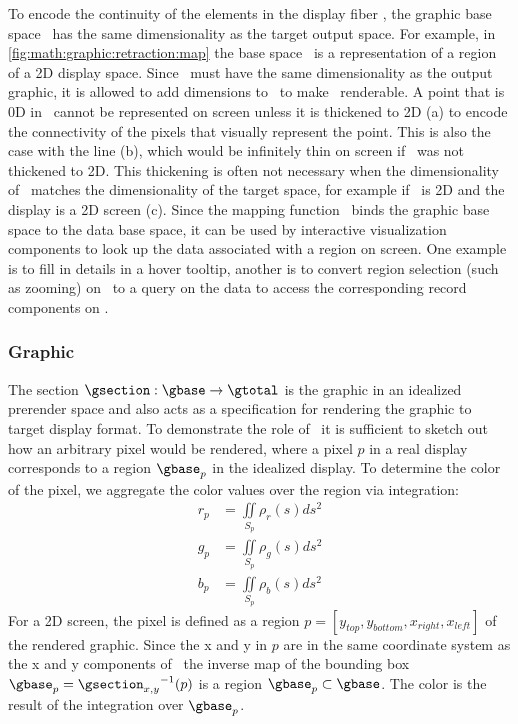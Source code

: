 \documentclass[../main.tex]{subfiles}
\begin{document}
To encode the continuity of the elements in the display fiber \gfiber, the graphic base space \gbase\ has the same dimensionality as the target output space. For example, in \autoref{fig:math:graphic:retraction:map} the base space \gbase\ is a representation of a region of a 2D display space. Since \gbase\ must have the same dimensionality as the output graphic, it is allowed to add dimensions to \dbase\ to make \dbase\ renderable. A point that is 0D in \dbase\ cannot be represented on screen unless it is thickened to 2D (a) to encode the connectivity of the pixels that visually represent the point. This is also the case with the line (b), which would be infinitely thin on screen if \gbase\ was not thickened to 2D. This thickening is often not necessary when the dimensionality of \dbase\ matches the dimensionality of the target space, for example if \dbase\ is 2D and the display is a 2D screen (c). Since the mapping function \vindex\ binds the graphic base space to the data base space, it can be used by interactive visualization components to look up the data associated with a region on screen.  One example is to fill in details in a hover tooltip, another is to convert region selection (such as zooming) on \gbase\ to a query on the data to access the corresponding record components on \dbase.

\subsubsection{Graphic}
\label{sec:math:graphic:section}
The section \(\gsection: \gbase \rightarrow \gtotal\) is the graphic in an idealized prerender space and also acts as a specification for rendering the graphic to target display format. To demonstrate the role of \gsection\, it is sufficient to sketch out how an arbitrary pixel would be rendered, where a pixel \(p\) in a real display corresponds to a region \(\gbase_p\) in the idealized display. To determine the color of the pixel, we aggregate the color values over the region via integration:
\begin{align*}
    \label{eq:math:graphic:section:color}
    r_p &= \iint\limits_{S_p} \rho_r(s)ds^{2}\\
    g_p &= \iint\limits_{S_p} \rho_g(s)ds^{2}\\
    b_p &= \iint\limits_{S_p} \rho_b(s)ds^{2}
\end{align*}
For a 2D screen, the pixel is defined as a region \(p=\left[y_{top}, y_{bottom}, x_{right}, x_{left}\right]\) of the rendered graphic. Since the x and y in \(p\) are in the same coordinate system as the x and y components of \gfiber\,  the inverse map of the bounding box \(\gbase_{p} ={\gsection_{x,y}}^{-1}(p)\) is a region \(\gbase_p \subset \gbase\). The color is the result of the integration over  \(\gbase_p\).
\end{document}

